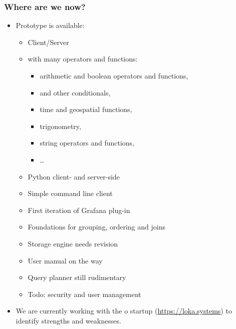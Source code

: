 \documentclass{beamer}
\begin{document}
\begin{frame}[shrink]
\frametitle{Where are we now?}
\begin{itemize}
\item Prototype is available:
      \bgroup
      \begin{itemize}
      \item Client/Server
      \item {} with many operators and functions:
            \begin{itemize}
            \item arithmetic and boolean operators and functions,
            \item {} and other conditionals,
            \item time and geospatial functions,
            \item trigonometry,
            \item string operators and functions,
            \item \dots
            \end{itemize}
      \item Python client- and server-side
      \item Simple command line client
      \item First iteration of Grafana plug-in
      \item Foundations for grouping, ordering and joins
      \item Storage engine needs revision
      \item User manual on the way
      \item Query planner still rudimentary
      \item Todo: security and user management
      \end{itemize}
      \egroup
\item We are currently working with the o
      startup  (\url{https://loka.systems})
      to identify strengths and weaknesses.
\end{itemize}
\end{frame}
\end{document}
